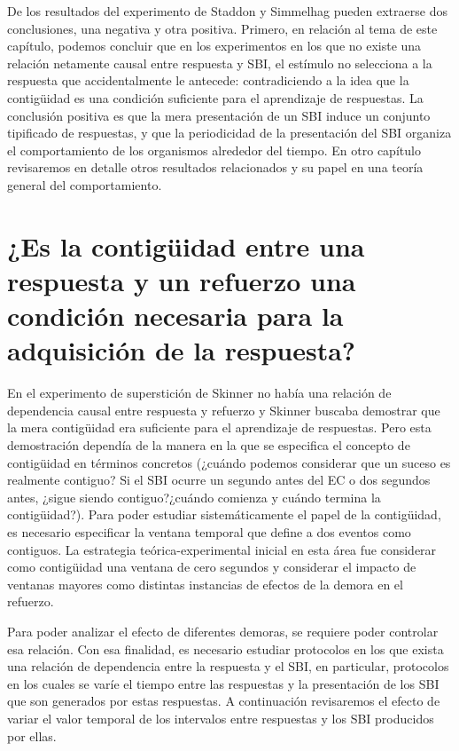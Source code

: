 \documentclass[
  letterpaper,
]{book}
\begin{document}
De los resultados del experimento de Staddon y Simmelhag pueden
extraerse dos conclusiones, una negativa y otra positiva. Primero, en
relación al tema de este capítulo, podemos concluir que en los
experimentos en los que no existe una relación netamente causal entre
respuesta y SBI, el estímulo no selecciona a la respuesta que
accidentalmente le antecede: contradiciendo a la idea que la contigüidad
es una condición suficiente para el aprendizaje de respuestas. La
conclusión positiva es que la mera presentación de un SBI induce un
conjunto tipificado de respuestas, y que la periodicidad de la
presentación del SBI organiza el comportamiento de los organismos
alrededor del tiempo. En otro capítulo revisaremos en detalle otros
resultados relacionados y su papel en una teoría general del
comportamiento.

\section{¿Es la contigüidad entre una respuesta y un refuerzo una
condición necesaria para la adquisición de la
respuesta?}\label{es-la-contiguxfcidad-entre-una-respuesta-y-un-refuerzo-una-condiciuxf3n-necesaria-para-la-adquisiciuxf3n-de-la-respuesta}

En el experimento de superstición de Skinner no había una relación de
dependencia causal entre respuesta y refuerzo y Skinner buscaba
demostrar que la mera contigüidad era suficiente para el aprendizaje de
respuestas. Pero esta demostración dependía de la manera en la que se
especifica el concepto de contigüidad en términos concretos (¿cuándo
podemos considerar que un suceso es realmente contiguo? Si el SBI ocurre
un segundo antes del EC o dos segundos antes, ¿sigue siendo
contiguo?¿cuándo comienza y cuándo termina la contigüidad?). Para poder
estudiar sistemáticamente el papel de la contigüidad, es necesario
especificar la ventana temporal que define a dos eventos como contiguos.
La estrategia teórica-experimental inicial en esta área fue considerar
como contigüidad una ventana de cero segundos y considerar el impacto de
ventanas mayores como distintas instancias de efectos de la demora en el
refuerzo.

Para poder analizar el efecto de diferentes demoras, se requiere poder
controlar esa relación. Con esa finalidad, es necesario estudiar
protocolos en los que exista una relación de dependencia entre la
respuesta y el SBI, en particular, protocolos en los cuales se varíe el
tiempo entre las respuestas y la presentación de los SBI que son
generados por estas respuestas. A continuación revisaremos el efecto de
variar el valor temporal de los intervalos entre respuestas y los SBI
producidos por ellas.
\end{document}
